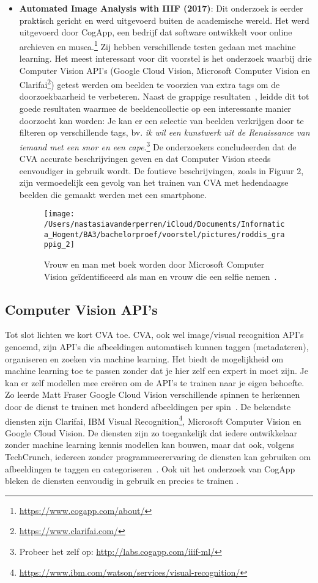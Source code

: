 \begin{itemize}
	\item \textbf{Automated Image Analysis with IIIF (2017)}: Dit onderzoek is eerder praktisch gericht en werd uitgevoerd buiten de academische wereld. Het werd uitgevoerd door CogApp, een bedrijf dat software ontwikkelt voor online archieven en musea.\footnote{\url{https://www.cogapp.com/about/}} Zij hebben verschillende testen gedaan met machine learning. Het meest interessant voor dit voorstel is het onderzoek waarbij drie Computer Vision API's (Google Cloud Vision, Microsoft Computer Vision en Clarifai\footnote{\url{https://www.clarifai.com/}}) getest werden om beelden te voorzien van extra tags om de doorzoekbaarheid te verbeteren. Naast de grappige resultaten~\autocite{Roddis2018}, leidde dit tot goede resultaten waarmee de beeldencollectie op een interessante manier doorzocht kan worden: Je kan er een selectie van beelden verkrijgen door te filteren op verschillende tags, bv. \emph{ik wil een kunstwerk uit de Renaissance van iemand met een snor en een cape}.\footnote{Probeer het zelf op: \url{http://labs.cogapp.com/iiif-ml/}} De onderzoekers concludeerden dat de CVA accurate beschrijvingen geven en dat Computer Vision steeds eenvoudiger in gebruik wordt. De foutieve beschrijvingen, zoals in Figuur 2, zijn vermoedelijk een gevolg van het trainen van CVA met hedendaagse beelden die gemaakt werden met een smartphone.~\autocite{Hindle2017}

	\begin{figure}[h]
		\caption{Vrouw en man met boek worden door Microsoft Computer Vision ge\"{i}dentificeerd als man en vrouw die een selfie nemen~\autocite{Roddis2018}.}
		\centering
		\texttt{[image: /Users/nastasiavanderperren/iCloud/Documents/Informatica\_Hogent/BA3/bachelorproef/voorstel/pictures/roddis\_grappig\_2]}
	\end{figure}

\end{itemize}

\subsection{Computer Vision API's}
Tot slot lichten we kort CVA toe. CVA, ook wel image/visual recognition API's genoemd, zijn API's die afbeeldingen automatisch kunnen taggen (metadateren), organiseren en zoeken via machine learning. Het biedt de mogelijkheid om machine learning toe te passen zonder dat je hier zelf een expert in moet zijn. Je kan er zelf modellen mee cre\"{e}ren om de API's te trainen naar je eigen behoefte. Zo leerde Matt Fraser Google Cloud Vision verschillende spinnen te herkennen door de dienst te trainen met honderd afbeeldingen per spin~\autocite{Fraser2018}.  De bekendste diensten zijn Clarifai, IBM Visual Recognition\footnote{\url{https://www.ibm.com/watson/services/visual-recognition/}}, Microsoft Computer Vision en Google Cloud Vision.  De diensten zijn zo toegankelijk dat iedere ontwikkelaar zonder machine learning kennis modellen kan bouwen, maar dat ook, volgens TechCrunch, iedereen zonder programmeerervaring de diensten kan gebruiken om afbeeldingen te taggen en categoriseren~\autocite{Lardinois2018}. Ook uit het onderzoek van CogApp bleken de diensten eenvoudig in gebruik en precies te trainen \autocite{Hindle2017}.

